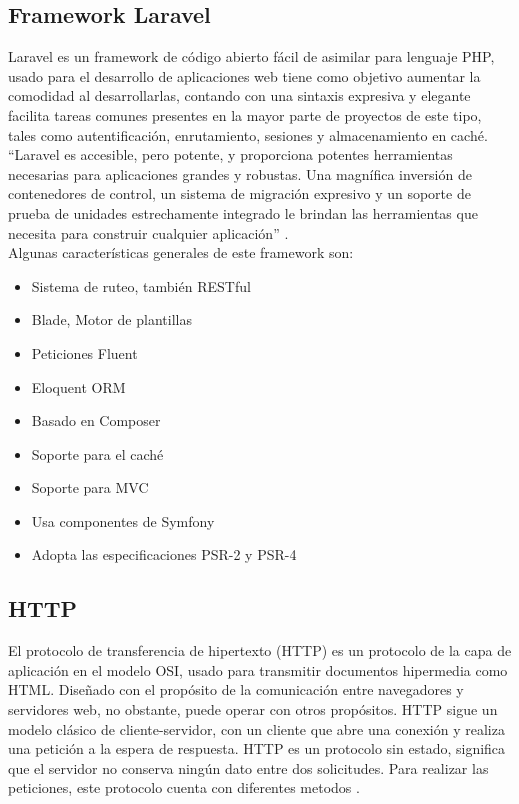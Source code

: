 \subsection{Framework Laravel}

Laravel es un framework de código abierto fácil de asimilar para lenguaje PHP, usado para el desarrollo de aplicaciones web tiene como objetivo aumentar la comodidad al desarrollarlas, contando con una sintaxis expresiva y elegante facilita tareas comunes presentes en la mayor parte de proyectos de este tipo, tales como autentificación, enrutamiento, sesiones y almacenamiento en caché. \\

“Laravel es accesible, pero potente, y proporciona potentes herramientas necesarias para aplicaciones grandes y robustas. Una magnífica inversión de contenedores de control, un sistema de migración expresivo y un soporte de prueba de unidades estrechamente integrado le brindan las herramientas que necesita para construir cualquier aplicación'' \cite{Lara}.\\

Algunas características generales de este framework son:



\begin{itemize}
	\item Sistema de ruteo, también RESTful
	\item Blade, Motor de plantillas
	\item Peticiones Fluent
	\item Eloquent ORM
	\item Basado en Composer
	\item Soporte para el caché
	\item Soporte para MVC
	\item Usa componentes de Symfony
	\item Adopta las especificaciones PSR-2 y PSR-4	
\end{itemize}

\subsection{HTTP}

El protocolo de transferencia de hipertexto (HTTP) es un protocolo de la capa de aplicación en el modelo OSI, usado para transmitir documentos hipermedia como HTML. Diseñado con el propósito de la comunicación entre navegadores y servidores web, no obstante, puede operar con otros propósitos. HTTP sigue un modelo clásico de cliente-servidor, con un cliente que abre una conexión y realiza una petición a la espera de respuesta. HTTP es un protocolo sin estado, significa que el servidor no conserva ningún dato entre dos solicitudes. Para realizar las peticiones, este protocolo cuenta con diferentes metodos \cite{HTTP}.

